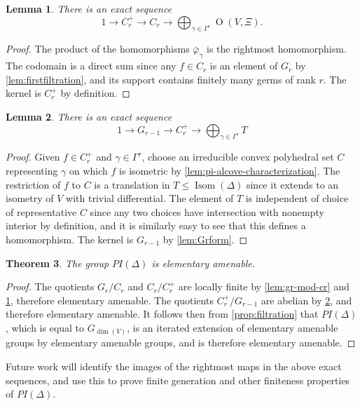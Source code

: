 \documentclass[11pt]{amsart}
\newtheorem{theorem}{Theorem}[section]
\newtheorem{lemma}[theorem]{Lemma}
\numberwithin{table}{section}
\numberwithin{figure}{section}
\theoremstyle{remark}
\DeclareMathOperator{\Isom}{Isom}
\DeclareMathOperator{\matrixO}{O}
\begin{document}
\begin{lemma} \label{lem:cr-mod-crplus}
  There is an exact sequence
  \[
    1 \to C^+_r \to C_r \to \bigoplus_{\gamma \in \Gamma^r}
    \matrixO(V,\Xi).
  \]
\end{lemma}
\begin{proof}
  The product of the homomorphisms $\bar \varphi_\gamma$ is the
  rightmost homomorphism. The codomain is a direct sum since any $f\in
  C_r$ is an element of $G_r$ by \cref{lem:firstfiltration}, and
  its support contains finitely many germs of rank $r$. The kernel is
  $C^+_r$ by definition.
\end{proof}

\begin{lemma} \label{lem:crplus-mod-gr}
  There is an exact sequence
  \[
    1 \to G_{r-1} \to C_r^+ \to \bigoplus_{\gamma \in \Gamma^r} T
  \]
\end{lemma}
\begin{proof}
  Given $f\in C^+_r$ and $\gamma\in \Gamma^r$, choose an irreducible
  convex polyhedral set $C$ representing $\gamma$ on which $f$ is
  isometric by \cref{lem:pi-alcove-characterization}. The restriction
  of $f$ to $C$ is a translation in $T \leq \Isom(\Delta)$ since it
  extends to an isometry of $V$ with trivial differential. The element
  of $T$ is independent of choice of representative $C$ since any two
  choices have intersection with nonempty interior by definition, and
  it is similarly easy to see that this defines a homomorphism. The
  kernel is $G_{r-1}$ by \cref{lem:Grform}.
\end{proof}

\begin{theorem}
  The group $PI(\Delta)$ is elementary amenable.
\end{theorem}
\begin{proof}
  The quotients $G_r/ C_r$ and $C_r / C_r^+$ are locally finite by
  \cref{lem:gr-mod-cr} and \cref{lem:cr-mod-crplus}, therefore
  elementary amenable. The quotients $C_r^+ / G_{r-1}$ are abelian by
  \cref{lem:crplus-mod-gr}, and therefore elementary amenable. It
  follows then from \cref{prop:filtration} that $PI(\Delta)$, which is
  equal to $G_{\dim(V)}$, is an iterated extension of elementary
  amenable groups by elementary amenable groups, and is therefore
  elementary amenable.
\end{proof}

Future work will identify the images of the rightmost maps in the
above exact sequences, and use this to prove finite generation and
other finiteness properties of $PI(\Delta)$.
\end{document}

